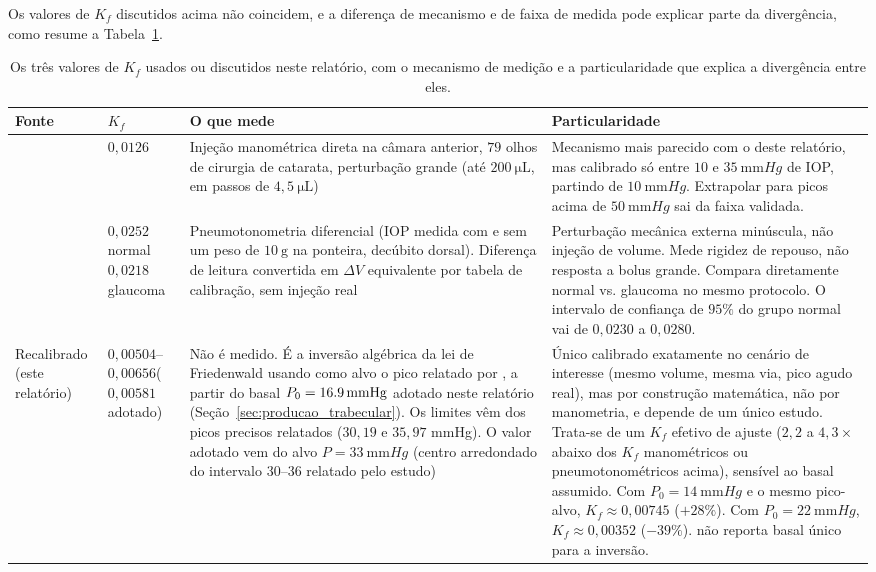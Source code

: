 Os valores de $K_f$ discutidos acima não coincidem, e a diferença de mecanismo e de faixa de medida pode explicar parte da divergência, como resume a Tabela~\ref{tab:kf_comparacao}. 
 
\begin{table}[htbp]
\centering
\caption{Os três valores de $K_f$ usados ou discutidos neste relatório, com o mecanismo de medição e a particularidade que explica a divergência entre eles.}
\label{tab:kf_comparacao}
\small
\begin{tabular}{p{2.4cm}p{1.5cm}p{4.4cm}p{5.3cm}}
\toprule
Fonte & $K_f$ & O que mede & Particularidade \\
\midrule
\citet{pallikaris2005} &
$0{,}0126$ &
Injeção manométrica direta na câmara anterior, $79$ olhos de cirurgia de catarata, perturbação grande (até $200\ \unit{\micro\liter}$, em passos de $4{,}5\ \unit{\micro\liter}$) &
Mecanismo mais parecido com o deste relatório, mas calibrado só entre $10$ e $\SI{35}{\milli\meter Hg}$ de IOP, partindo de $\SI{10}{\milli\meter Hg}$. Extrapolar para picos acima de $\SI{50}{\milli\meter Hg}$ sai da faixa validada. \\
\addlinespace
\citet{kazemi2021} &
$0{,}0252$ normal\newline $0{,}0218$ glaucoma &
Pneumotonometria diferencial (IOP medida com e sem um peso de $10\ \unit{\gram}$ na ponteira, decúbito dorsal). Diferença de leitura convertida em $\Delta V$ equivalente por tabela de calibração, sem injeção real &
Perturbação mecânica externa minúscula, não injeção de volume. Mede rigidez de repouso, não resposta a bolus grande. Compara diretamente normal vs. glaucoma no mesmo protocolo. O intervalo de confiança de $95\%$ do grupo normal vai de $0{,}0230$ a $0{,}0280$. \\

\addlinespace
Recalibrado (este relatório) &
$0{,}00504$--$0{,}00656$\newline ($0{,}00581$ adotado) &
Não é medido. É a inversão algébrica da lei de Friedenwald usando como alvo o pico relatado por \citet{knecht2009}, a partir do basal $P_0=\SI{16{,}9}{\milli\meter Hg}$ adotado neste relatório (Seção~\ref{sec:producao_trabecular}). Os limites vêm dos picos precisos relatados ($30{,}19$ e $35{,}97$ mmHg). O valor adotado vem do alvo $P=\SI{33}{\milli\meter Hg}$ (centro arredondado do intervalo $30$--$36$ relatado pelo estudo) &
Único calibrado exatamente no cenário de interesse (mesmo volume, mesma via, pico agudo real), mas por construção matemática, não por manometria, e depende de um único estudo. Trata-se de um $K_f$ efetivo de ajuste ($2{,}2$ a $4{,}3\times$ abaixo dos $K_f$ manométricos ou pneumotonométricos acima), sensível ao basal assumido. Com $P_0=\SI{14}{\milli\meter Hg}$ e o mesmo pico-alvo, $K_f\approx0{,}00745$ ($+28\%$). Com $P_0=\SI{22}{\milli\meter Hg}$, $K_f\approx0{,}00352$ ($-39\%$). \citet{knecht2009} não reporta basal único para a inversão. \\
\bottomrule
\end{tabular}
\end{table}
 
